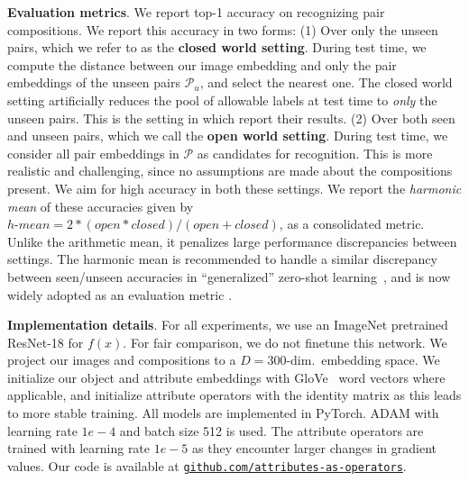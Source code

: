 \documentclass[runningheads]{llncs}
\begin{document}
\vspace{0.05in}
\noindent\textbf{Evaluation metrics}. We report top-1 accuracy on recognizing pair compositions. We report this accuracy in two forms: (1) Over only the unseen pairs, which we refer to as the \textbf{closed world setting}.  During test time, we compute the distance between our image embedding and only the pair embeddings of the unseen pairs $\mathcal{P}_u$, and select the nearest one. The closed world setting artificially reduces the pool of allowable labels at test time to \emph{only} the unseen pairs. This is the setting in which \cite{misra2017red} report their results.
(2) Over both seen and unseen pairs, which we call the \textbf{open world setting}.  During test time, we consider all pair embeddings in $\mathcal{P}$ as candidates for recognition. This is more realistic and challenging, since no assumptions are made about the compositions present. We aim for high accuracy in both these settings. We report the \emph{harmonic mean} of these accuracies given by $h \mbox{-} mean = 2 \ast (open \ast closed)/(open + closed)$, as a consolidated metric. Unlike the arithmetic mean, it penalizes large performance discrepancies between settings. The harmonic mean is recommended to handle a similar discrepancy between seen/unseen accuracies in ``generalized'' zero-shot learning~\cite{xian2017zero}, and is now widely adopted as an evaluation metric \cite{verma2018generalized,xian2018feature,chen2018zero,wang2017alternative}.


\vspace{0.05in}
\noindent\textbf{Implementation details}.
For all experiments, we use an ImageNet \cite{russakovsky2015imagenet} pretrained ResNet-18 \cite{he2016deep} for $f(x)$. For fair comparison, we do not finetune this network.
We project our images and compositions to a $D=300$-dim.~embedding space.
We initialize our object and attribute embeddings with GloVe~\cite{pennington2014glove} word vectors where applicable, and initialize attribute operators with the identity matrix as this leads to more stable training. All models are implemented in PyTorch. ADAM with learning rate $1e -4$ and batch size 512 is used. The attribute operators are trained with learning rate $1e-5$ as they encounter larger changes in gradient values. Our code is available at \href{https://github.com/Tushar-N/attributes-as-operators}{\texttt{github.com/attributes-as-operators}}.
\end{document}
